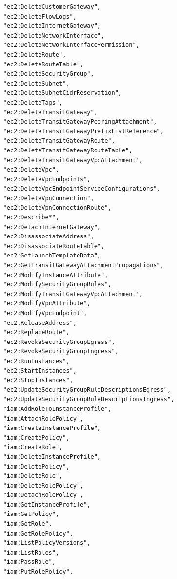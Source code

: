 \begin{verbatim}
                "ec2:DeleteCustomerGateway",
                "ec2:DeleteFlowLogs",
                "ec2:DeleteInternetGateway",
                "ec2:DeleteNetworkInterface",
                "ec2:DeleteNetworkInterfacePermission",
                "ec2:DeleteRoute",
                "ec2:DeleteRouteTable",
                "ec2:DeleteSecurityGroup",
                "ec2:DeleteSubnet",
                "ec2:DeleteSubnetCidrReservation",
                "ec2:DeleteTags",
                "ec2:DeleteTransitGateway",
                "ec2:DeleteTransitGatewayPeeringAttachment",
                "ec2:DeleteTransitGatewayPrefixListReference",
                "ec2:DeleteTransitGatewayRoute",
                "ec2:DeleteTransitGatewayRouteTable",
                "ec2:DeleteTransitGatewayVpcAttachment",
                "ec2:DeleteVpc",
                "ec2:DeleteVpcEndpoints",
                "ec2:DeleteVpcEndpointServiceConfigurations",
                "ec2:DeleteVpnConnection",
                "ec2:DeleteVpnConnectionRoute",
                "ec2:Describe*",
                "ec2:DetachInternetGateway",
                "ec2:DisassociateAddress",
                "ec2:DisassociateRouteTable",
                "ec2:GetLaunchTemplateData",
                "ec2:GetTransitGatewayAttachmentPropagations",
                "ec2:ModifyInstanceAttribute",
                "ec2:ModifySecurityGroupRules",
                "ec2:ModifyTransitGatewayVpcAttachment",
                "ec2:ModifyVpcAttribute",
                "ec2:ModifyVpcEndpoint",
                "ec2:ReleaseAddress",
                "ec2:ReplaceRoute",
                "ec2:RevokeSecurityGroupEgress",
                "ec2:RevokeSecurityGroupIngress",
                "ec2:RunInstances",
                "ec2:StartInstances",
                "ec2:StopInstances",
                "ec2:UpdateSecurityGroupRuleDescriptionsEgress",
                "ec2:UpdateSecurityGroupRuleDescriptionsIngress",
                "iam:AddRoleToInstanceProfile",
                "iam:AttachRolePolicy",
                "iam:CreateInstanceProfile",
                "iam:CreatePolicy",
                "iam:CreateRole",
                "iam:DeleteInstanceProfile",
                "iam:DeletePolicy",
                "iam:DeleteRole",
                "iam:DeleteRolePolicy",
                "iam:DetachRolePolicy",
                "iam:GetInstanceProfile",
                "iam:GetPolicy",
                "iam:GetRole",
                "iam:GetRolePolicy",
                "iam:ListPolicyVersions",
                "iam:ListRoles",
                "iam:PassRole",
                "iam:PutRolePolicy",

\end{verbatim}
